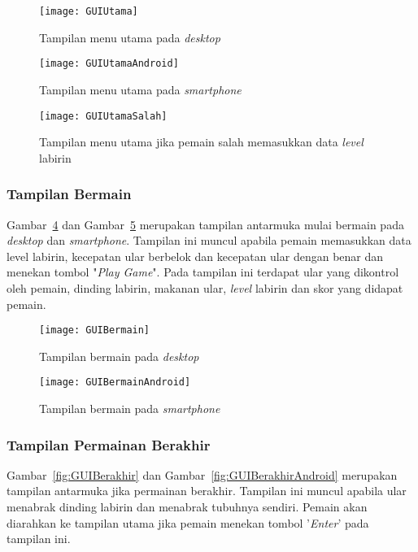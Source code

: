 \begin{figure}[H]
	\centering  
	\texttt{[image: GUIUtama]}  
	\caption[Tampilan menu utama pada \textit{desktop}]{Tampilan menu utama pada \textit{desktop}}
	\label{fig:GUIUtama} 
\end{figure}

\begin{figure}[H]
	\centering  
	\texttt{[image: GUIUtamaAndroid]}  
	\caption[Tampilan menu utama pada \textit{smartphone}]{Tampilan menu utama pada \textit{smartphone}}
	\label{fig:GUIUtamaAndroid} 
\end{figure}

\begin{figure}[H]
	\centering  
	\texttt{[image: GUIUtamaSalah]}  
	\caption[Tampilan menu utama jika pemain salah memasukkan data \textit{level} labirin]{Tampilan menu utama jika pemain salah memasukkan data \textit{level} labirin}
	\label{fig:GUIUtamaSalah} 
\end{figure}

\subsubsection{Tampilan Bermain}
Gambar~\ref{fig:GUIBermain} dan Gambar~\ref{fig:GUIBermainAndroid} merupakan tampilan antarmuka mulai bermain pada \textit{desktop} dan \textit{smartphone}. Tampilan ini muncul apabila pemain memasukkan data level labirin, kecepatan ular berbelok dan kecepatan ular dengan benar dan menekan tombol "\textit{Play Game}". Pada tampilan ini terdapat ular yang dikontrol oleh pemain, dinding labirin, makanan ular, \textit{level} labirin dan skor yang didapat pemain.

\begin{figure}[H]
	\centering  
	\texttt{[image: GUIBermain]}  
	\caption[Tampilan bermain pada \textit{desktop}]{Tampilan bermain pada \textit{desktop}}
	\label{fig:GUIBermain} 
\end{figure}

\begin{figure}[H]
	\centering  
	\texttt{[image: GUIBermainAndroid]}  
	\caption[Tampilan bermain pada \textit{smartphone}]{Tampilan bermain pada \textit{smartphone}}
	\label{fig:GUIBermainAndroid} 
\end{figure}

\subsubsection{Tampilan Permainan Berakhir}
Gambar~\ref{fig:GUIBerakhir} dan Gambar~\ref{fig:GUIBerakhirAndroid} merupakan tampilan antarmuka jika permainan berakhir. Tampilan ini muncul apabila ular menabrak dinding labirin dan menabrak tubuhnya sendiri. Pemain akan diarahkan ke tampilan utama jika pemain menekan tombol '\textit{Enter}' pada tampilan ini.

